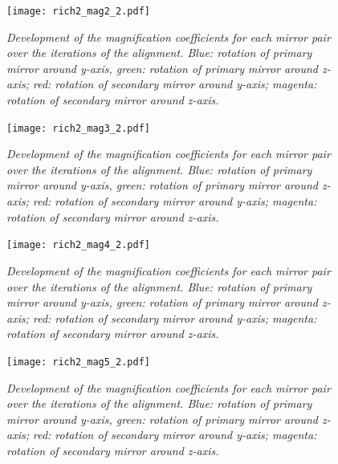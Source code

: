 \begin{figure}[!ht]
	\vspace*{-0.cm}
	\begin{center}
		\texttt{[image: rich2\_mag2\_2.pdf]}
		\vspace*{-1.5cm}
	\end{center}
	\caption{\textit{Development of the magnification coefficients for each mirror pair over the iterations of the alignment. Blue: rotation of primary mirror around y-axis, green: rotation of primary mirror around z-axis; red: rotation of secondary mirror around y-axis; magenta: rotation of secondary mirror around z-axis.}}
	\label{fig:rich2mag2_2}
\end{figure}
\begin{figure}[!ht]
	\vspace*{-0.cm}
	\begin{center}
		\texttt{[image: rich2\_mag3\_2.pdf]}
		\vspace*{-1.5cm}
	\end{center}
	\caption{\textit{Development of the magnification coefficients for each mirror pair over the iterations of the alignment. Blue: rotation of primary mirror around y-axis, green: rotation of primary mirror around z-axis; red: rotation of secondary mirror around y-axis; magenta: rotation of secondary mirror around z-axis.}}
	\label{fig:rich2mag3_2}
\end{figure}
\begin{figure}[!ht]
	\vspace*{-0.cm}
	\begin{center}
		\texttt{[image: rich2\_mag4\_2.pdf]}
		\vspace*{-1.5cm}
	\end{center}
	\caption{\textit{Development of the magnification coefficients for each mirror pair over the iterations of the alignment. Blue: rotation of primary mirror around y-axis, green: rotation of primary mirror around z-axis; red: rotation of secondary mirror around y-axis; magenta: rotation of secondary mirror around z-axis.}}
	\label{fig:rich2mag4_2}
\end{figure}
\begin{figure}[!ht]
	\vspace*{-0.cm}
	\begin{center}
		\texttt{[image: rich2\_mag5\_2.pdf]}
		\vspace*{-1.5cm}
	\end{center}
	\caption{\textit{Development of the magnification coefficients for each mirror pair over the iterations of the alignment. Blue: rotation of primary mirror around y-axis, green: rotation of primary mirror around z-axis; red: rotation of secondary mirror around y-axis; magenta: rotation of secondary mirror around z-axis.}}
	\label{fig:rich2mag5_2}
\end{figure}
